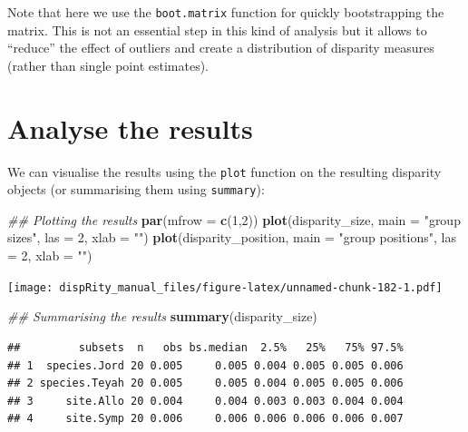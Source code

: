 \documentclass[]{book}
\newenvironment{Shaded}{\begin{snugshade}}{\end{snugshade}}
\newcommand{\CommentTok}[1]{\textcolor[rgb]{0.56,0.35,0.01}{\textit{#1}}}
\newcommand{\DataTypeTok}[1]{\textcolor[rgb]{0.13,0.29,0.53}{#1}}
\newcommand{\DecValTok}[1]{\textcolor[rgb]{0.00,0.00,0.81}{#1}}
\newcommand{\KeywordTok}[1]{\textcolor[rgb]{0.13,0.29,0.53}{\textbf{#1}}}
\newcommand{\NormalTok}[1]{#1}
\newcommand{\StringTok}[1]{\textcolor[rgb]{0.31,0.60,0.02}{#1}}
\begin{document}
Note that here we use the \texttt{boot.matrix} function for quickly bootstrapping the matrix.
This is not an essential step in this kind of analysis but it allows to ``reduce'' the effect of outliers and create a distribution of disparity measures (rather than single point estimates).

\hypertarget{analyse-the-results}{%
\section{Analyse the results}\label{analyse-the-results}}

We can visualise the results using the \texttt{plot} function on the resulting disparity objects (or summarising them using \texttt{summary}):

\begin{Shaded}
\begin{Highlighting}[]
\CommentTok{## Plotting the results}
\KeywordTok{par}\NormalTok{(}\DataTypeTok{mfrow =} \KeywordTok{c}\NormalTok{(}\DecValTok{1}\NormalTok{,}\DecValTok{2}\NormalTok{))}
\KeywordTok{plot}\NormalTok{(disparity_size, }\DataTypeTok{main =} \StringTok{"group sizes"}\NormalTok{, }\DataTypeTok{las =} \DecValTok{2}\NormalTok{, }\DataTypeTok{xlab =} \StringTok{""}\NormalTok{)}
\KeywordTok{plot}\NormalTok{(disparity_position, }\DataTypeTok{main =} \StringTok{"group positions"}\NormalTok{, }\DataTypeTok{las =} \DecValTok{2}\NormalTok{, }\DataTypeTok{xlab =} \StringTok{""}\NormalTok{)}
\end{Highlighting}
\end{Shaded}

\texttt{[image: dispRity\_manual\_files/figure-latex/unnamed-chunk-182-1.pdf]}

\begin{Shaded}
\begin{Highlighting}[]
\CommentTok{## Summarising the results}
\KeywordTok{summary}\NormalTok{(disparity_size)}
\end{Highlighting}
\end{Shaded}

\begin{verbatim}
##         subsets  n   obs bs.median  2.5%   25%   75% 97.5%
## 1  species.Jord 20 0.005     0.005 0.004 0.005 0.005 0.006
## 2 species.Teyah 20 0.005     0.005 0.004 0.005 0.005 0.006
## 3     site.Allo 20 0.004     0.004 0.003 0.003 0.004 0.004
## 4     site.Symp 20 0.006     0.006 0.006 0.006 0.006 0.007
\end{verbatim}
\end{document}
